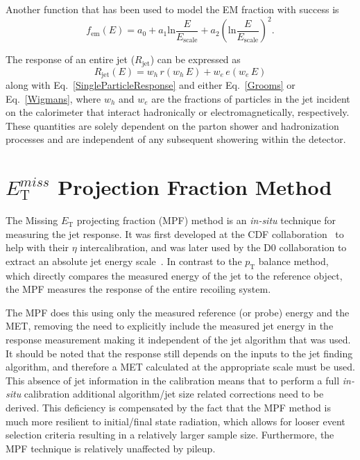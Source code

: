 \noindent 
Another function that has been used to model the EM fraction with success is 
\begin{equation}
  \label{Wigmans}
  f_{\mathrm{em}}\left(E\right)=a_0+a_1\mathrm{ln}\frac{E}{E_{\mathrm{scale}}}+a_2\left(\mathrm{ln}\frac{E}{E_{\mathrm{scale}}}\right)^2.
\end{equation}

The response of an entire jet ($R_{\mathrm{jet}}$) can be expressed as 
\begin{equation}
  R_{\mathrm{jet}}\left(E\right)=w_h\,r\left(w_h\,E\right)+w_e\,e\left(w_e\,E\right)
\end{equation}
along with Eq.~\ref{SingleParticleResponse} and either Eq.~\ref{Grooms} or Eq.~\ref{Wigmans}, where $w_h$ and  $w_e$ are the fractions of particles in the jet incident on the calorimeter that interact hadronically or electromagnetically, respectively.  
These quantities are solely dependent on the parton shower and hadronization processes and are independent of any subsequent showering within the detector.   

\section{$E_{\mathrm T}^{miss}$ Projection Fraction Method}
\label{METProj}

The Missing $E_{\mathrm T}$ projecting fraction (MPF) method is an \textit{in-situ} technique for measuring the jet response.  
It was first developed at the CDF collaboration~\cite{abe1992dijet} to help with their $\eta$ intercalibration, and was later used by the D0 collaboration to extract an absolute jet energy scale~\cite{item/10150/186444}.  
In contrast to the $p_{\mathrm T}$ balance method, which directly compares the measured energy of the jet to the reference object, the MPF measures the response of the entire recoiling system.

The MPF does this using only the measured reference (or probe) energy and the MET, removing the need to explicitly include the measured jet energy in the response measurement making it independent of the jet algorithm that was used.  
It should be noted that the response still depends on the inputs to the jet finding algorithm, and therefore a MET calculated at the appropriate scale must be used.  
This absence of jet information in the calibration means that to perform a full \textit{in-situ} calibration additional algorithm/jet size related corrections need to be derived.  
This deficiency is compensated by the fact that the MPF method is much more resilient to initial/final state radiation, which allows for looser event selection criteria resulting in a relatively larger sample size.  
Furthermore, the MPF technique is relatively unaffected by pileup.  

